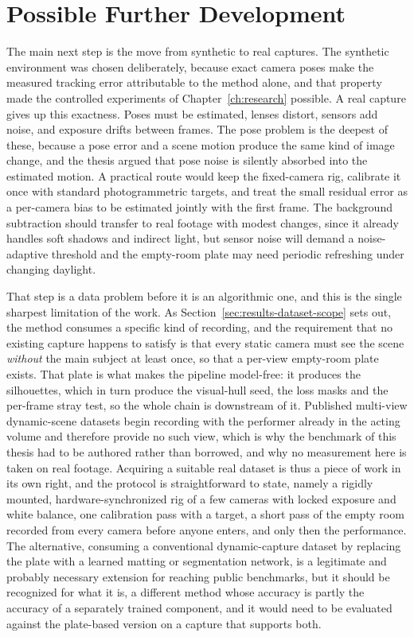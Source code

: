 \section{Possible Further Development}
\label{sec:conclusions-future}

The main next step is the move from synthetic to real captures. The
synthetic environment was chosen deliberately, because exact camera poses make the
measured tracking error attributable to the method alone, and that property made
the controlled experiments of Chapter~\ref{ch:research} possible. A real capture
gives up this exactness. Poses must be estimated, lenses distort, sensors add
noise, and exposure drifts between frames. The pose problem is the deepest of
these, because a pose error and a scene motion produce the same kind of image
change, and the thesis argued that pose noise is silently absorbed into the
estimated motion. A practical route would keep the fixed-camera rig, calibrate it
once with standard photogrammetric targets, and treat the small residual error as a
per-camera bias to be estimated jointly with the first frame. The background
subtraction should transfer to real footage with modest changes, since it already
handles soft shadows and indirect light, but sensor noise will demand a
noise-adaptive threshold and the empty-room plate may need periodic refreshing
under changing daylight.

That step is a data problem before it is an algorithmic one, and this is the
single sharpest limitation of the work. As
Section~\ref{sec:results-dataset-scope} sets out, the method consumes a specific
kind of recording, and the requirement that no existing capture happens to
satisfy is that every static camera must see the scene \emph{without} the main
subject at least once, so that a per-view empty-room plate exists. That plate is
what makes the pipeline model-free: it produces the silhouettes, which in turn
produce the visual-hull seed, the loss masks and the per-frame stray test, so
the whole chain is downstream of it. Published multi-view dynamic-scene datasets
begin recording with the performer already in the acting volume and therefore
provide no such view, which is why the benchmark of this thesis had to be
authored rather than borrowed, and why no measurement here is taken on real
footage. Acquiring a suitable real dataset is thus a piece of work in its own
right, and the protocol is straightforward to state, namely a rigidly mounted,
hardware-synchronized rig of a few cameras with locked exposure and white
balance, one calibration pass with a target, a short pass of the empty room
recorded from every camera before anyone enters, and only then the performance.
The alternative, consuming a conventional dynamic-capture dataset by replacing
the plate with a learned matting or segmentation network, is a legitimate and
probably necessary extension for reaching public benchmarks, but it should be
recognized for what it is, a different method whose accuracy is partly the
accuracy of a separately trained component, and it would need to be evaluated
against the plate-based version on a capture that supports both.

